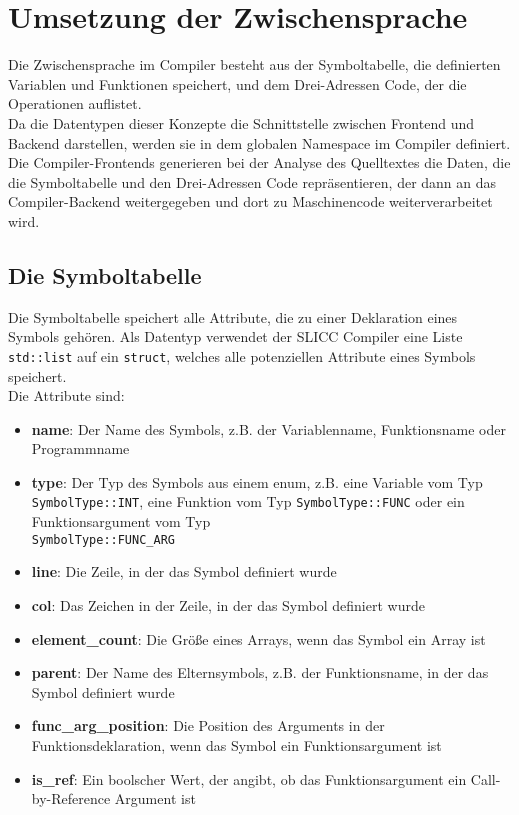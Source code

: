 \chapter{Umsetzung der Zwischensprache}
\label{chap:build:inBetweenState}

Die Zwischensprache im Compiler besteht aus der Symboltabelle, die definierten Variablen und Funktionen speichert, und dem Drei-Adressen Code, der die Operationen auflistet.\\
Da die Datentypen dieser Konzepte die Schnittstelle zwischen Frontend und Backend darstellen, werden sie in dem globalen Namespace im Compiler definiert.
Die Compiler-Frontends generieren bei der Analyse des Quelltextes die Daten, die die Symboltabelle und den Drei-Adressen Code repräsentieren, der dann an das Compiler-Backend weitergegeben und dort zu Maschinencode weiterverarbeitet wird.\\


\section{Die Symboltabelle}

Die Symboltabelle speichert alle Attribute, die zu einer Deklaration eines Symbols gehören.
Als Datentyp verwendet der \ac{SLICC} Compiler eine Liste \texttt{std::list} auf ein \texttt{struct}, welches alle potenziellen Attribute eines Symbols speichert.\\
Die Attribute sind:

\begin{itemize}
  \item \textbf{name}: Der Name des Symbols, z.B. der Variablenname, Funktionsname oder Programmname
  \item \textbf{type}: Der Typ des Symbols aus einem enum, z.B. eine Variable vom Typ \texttt{SymbolType::INT}, eine Funktion vom Typ \texttt{SymbolType::FUNC} oder ein Funktionsargument vom Typ\\ \texttt{SymbolType::FUNC\_ARG}
  \item \textbf{line}: Die Zeile, in der das Symbol definiert wurde
  \item \textbf{col}: Das Zeichen in der Zeile, in der das Symbol definiert wurde
  \item \textbf{element\_count}: Die Größe eines Arrays, wenn das Symbol ein Array ist
  \item \textbf{parent}: Der Name des Elternsymbols, z.B. der Funktionsname, in der das Symbol definiert wurde
  \item \textbf{func\_arg\_position}: Die Position des Arguments in der Funktionsdeklaration, wenn das Symbol ein Funktionsargument ist
  \item \textbf{is\_ref}: Ein boolscher Wert, der angibt, ob das Funktionsargument ein Call-by-Reference Argument ist
\end{itemize}

